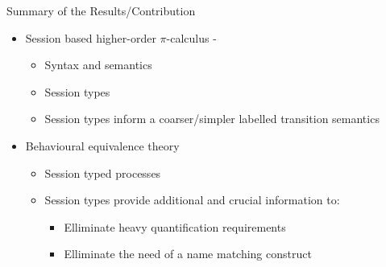 \documentclass{beamer}
\begin{document}
	\begin{frame}{Summary of the Results/Contribution}
		\begin{itemize}
			\item	Session based higher-order $\pi$-calculus - \HOp
				\begin{itemize}
					\item	Syntax and semantics
					\item	Session types
					\item	Session types inform a coarser/simpler labelled transition semantics
				\end{itemize}

			\item	Behavioural equivalence theory
				\begin{itemize}
					\item	Session typed processes
					\item	Session types provide additional and crucial information to:
					\begin{itemize}
						\item	Elliminate heavy quantification requirements
						\item	Elliminate the need of a name matching construct
					\end{itemize}
				\end{itemize}
		\end{itemize}

	\end{frame}
\end{document}
